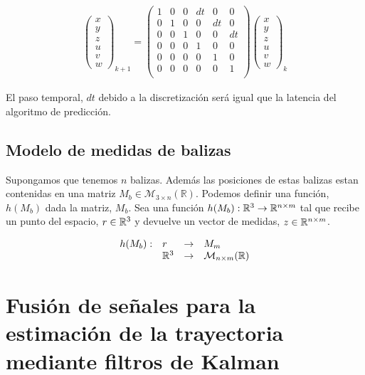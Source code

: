 \begin{gather} 
    \begin{pmatrix} \label{MRUDis}
        x \\ y \\ z \\
        u \\ v \\ w 
    \end{pmatrix}_{k+1} =
    \begin{pmatrix}
        1 & 0 & 0 & dt & 0  & 0 \\
        0 & 1 & 0 & 0  & dt & 0 \\
        0 & 0 & 1 & 0  & 0  & dt \\
        0 & 0 & 0 & 1  & 0  & 0 \\
        0 & 0 & 0 & 0  & 1  & 0 \\
        0 & 0 & 0 & 0  & 0  & 1 \\
    \end{pmatrix}
    \begin{pmatrix}
        x \\ y \\ z \\
        u \\ v \\ w     
    \end{pmatrix}_k
\end{gather}

El paso temporal, $dt$ debido a la discretización será igual que la latencia del algoritmo de predicción.




\subsection{Modelo de medidas de balizas} 

Supongamos que tenemos $n$ balizas. Además las posiciones de estas balizas estan contenidas en una  matriz $M_b \in \mathcal{M}_{3 \times n}(\mathbb{R})$. Podemos definir una función, $h(M_b)$ dada la matriz, $M_b$. Sea una función $h(M_b): \mathbb{R}^3 \rightarrow    \mathbb{R}^{n \times m}$ tal que recibe un punto del espacio, $r \in \mathbb{R}^3$ y devuelve un vector de medidas, $z \in \mathbb{R}^{n \times m}$.

\begin{gather}
    \begin{array}{llll}
        h(M_b):  & r     & \rightarrow & M_m \\
            & \mathbb{R}^3  & \rightarrow & \mathcal{M}_{n \times m}(\mathbb{R})    
    \end{array}
\end{gather}









\section{Fusión de señales para la estimación de la trayectoria mediante filtros de Kalman}

